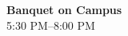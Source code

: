 \begin{calendar}{\textwidth}
{%
\textbf{Banquet on Campus} \\\vspace{0.1cm} 5:30 PM--8:00 PM \\\daysep %
}



\end{calendar}
